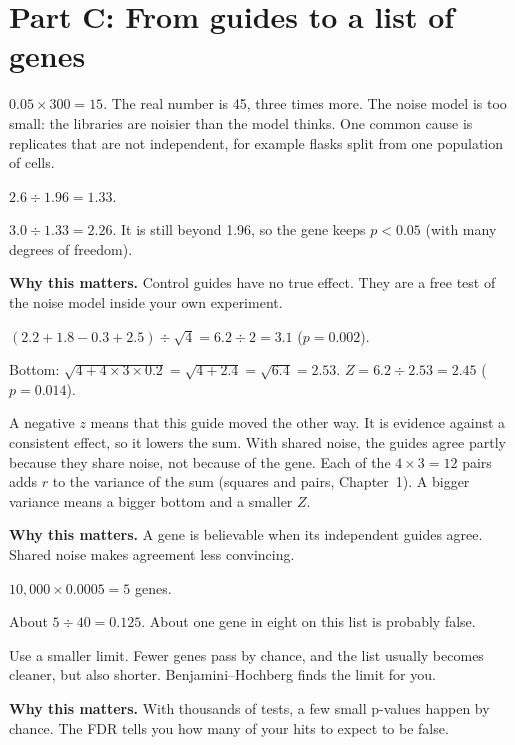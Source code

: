 \documentclass[12pt]{article}
\newcommand{\why}[1]{\par\smallskip\noindent\textcolor{barcsgreen!70!black}{\textbf{Why this matters.}} #1}
\begin{document}
\section*{Part C: From guides to a list of genes}
\begin{exlist}[resume]
\item
\begin{parts}
\item $0.05 \times 300 = 15$. The real number is 45, three times more. The
  noise model is too small: the libraries are noisier than the model
  thinks. One common cause is replicates that are not independent, for
  example flasks split from one population of cells.
\item $2.6 \div 1.96 = 1.33$.
\item $3.0 \div 1.33 = 2.26$. It is still beyond 1.96, so the gene keeps
  $p < 0.05$ (with many degrees of freedom).
\end{parts}
\why{Control guides have no true effect. They are a free test of the noise
model inside your own experiment.}

\item
\begin{parts}
\item $(2.2 + 1.8 - 0.3 + 2.5) \div \sqrt{4} = 6.2 \div 2 = 3.1$
  ($p = 0.002$).
\item Bottom: $\sqrt{4 + 4 \times 3 \times 0.2} = \sqrt{4 + 2.4} =
  \sqrt{6.4} = 2.53$. $Z = 6.2 \div 2.53 = 2.45$ ($p = 0.014$).
\item A negative $z$ means that this guide moved the other way. It is
  evidence against a consistent effect, so it lowers the sum. With shared
  noise, the guides agree partly because they share noise, not because of
  the gene. Each of the $4 \times 3 = 12$ pairs adds $r$ to the variance of
  the sum (squares and pairs, Chapter~1). A bigger variance means a bigger
  bottom and a smaller $Z$.
\end{parts}
\why{A gene is believable when its independent guides agree. Shared noise
makes agreement less convincing.}

\item
\begin{parts}
\item $10{,}000 \times 0.0005 = 5$ genes.
\item About $5 \div 40 = 0.125$. About one gene in eight on this list is
  probably false.
\item Use a smaller limit. Fewer genes pass by chance, and the list usually
  becomes cleaner, but also shorter. Benjamini--Hochberg finds the limit
  for you.
\end{parts}
\why{With thousands of tests, a few small p-values happen by chance. The
FDR tells you how many of your hits to expect to be false.}


\end{exlist}
\end{document}
